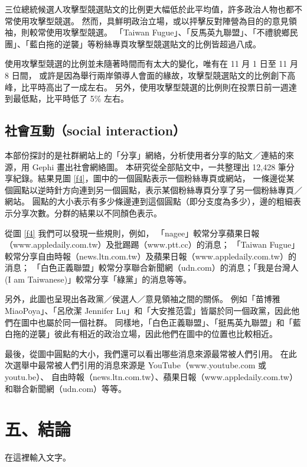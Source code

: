 \documentclass[letterpaper, 10pt, conference]{ieeeconf}   %
\begin{document}
\begin{CJK}{UTF8}{bsmi}
三位總統候選人攻擊型競選貼文的比例更大幅低於此平均值，許多政治人物也都不常使用攻擊型競選。%
然而，具鮮明政治立場，或以抨擊反對陣營為目的的意見領袖，則較常使用攻擊型競選。%
「Taiwan Fugue」、「反馬英九聯盟」、「不禮貌鄉民團」、「藍白拖的逆襲」等粉絲專頁攻擊型競選貼文的比例皆超過八成。%

使用攻擊型競選的比例並未隨著時間而有太大的變化，唯有在 11 月 1 日至 11 月 8 日間，%
或許是因為舉行兩岸領導人會面的緣故，攻擊型競選貼文的比例創下高峰，比平時高出了一成左右。%
另外，使用攻擊型競選的比例則在投票日前一週達到最低點，比平時低了 5\% 左右。%

\subsection*{社會互動（social interaction）}

本部份探討的是社群網站上的「分享」網絡，分析使用者分享的貼文／連結的來源，用 Gephi 畫出社會網絡圖。%
本研究從全部貼文中，一共整理出 12,428 筆分享紀錄。結果見圖 \ref{f4}，圖中的一個圓點表示一個粉絲專頁或網站，%
一條邊從某個圓點以逆時針方向連到另一個圓點，表示某個粉絲專頁分享了另一個粉絲專頁／網站。%
圓點的大小表示有多少條邊連到這個圓點（即分支度為多少），邊的粗細表示分享次數。分群的結果以不同顏色表示。%

從圖 \ref{f4} 我們可以發現一些規則，例如，%
「nagee」較常分享蘋果日報（www.appledaily.com.tw）及批踢踢（www.ptt.cc）的消息；%
「Taiwan Fugue」較常分享自由時報（news.ltn.com.tw）及蘋果日報（www.appledaily.com.tw）的消息；%
「白色正義聯盟」較常分享聯合新聞網（udn.com）的消息；「我是台灣人 (I am Taiwanese)」較常分享「綠黨」的消息等等。%

另外，此圖也呈現出各政黨／侯選人／意見領袖之間的關係。%
例如「苗博雅 MiaoPoya」、「呂欣潔 Jennifer Lu」和「大安推范雲」皆屬於同一個政黨，因此他們在圖中也屬於同一個社群。%
同樣地，「白色正義聯盟」、「挺馬英九聯盟」和「藍白拖的逆襲」彼此有相近的政治立場，因此他們在圖中的位置也比較相近。%

最後，從圖中圓點的大小，我們還可以看出哪些消息來源最常被人們引用。%
在此次選舉中最常被人們引用的消息來源是 YouTube（www.youtube.com 或 youtu.be）、%
自由時報（news.ltn.com.tw）、蘋果日報（www.appledaily.com.tw）和聯合新聞網（udn.com）等等。%

\section*{五、結論}

在這裡輸入文字。%

\addtolength{\textheight}{-12cm}  %


\end{CJK}
\end{document}
